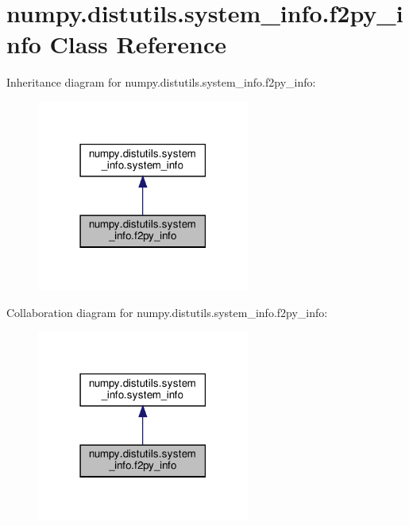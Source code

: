 \hypertarget{classnumpy_1_1distutils_1_1system__info_1_1f2py__info}{}\section{numpy.\+distutils.\+system\+\_\+info.\+f2py\+\_\+info Class Reference}
\label{classnumpy_1_1distutils_1_1system__info_1_1f2py__info}


Inheritance diagram for numpy.\+distutils.\+system\+\_\+info.\+f2py\+\_\+info\+:
\nopagebreak
\begin{figure}[H]
\begin{center}
\leavevmode
\includegraphics[width=198pt]{classnumpy_1_1distutils_1_1system__info_1_1f2py__info__inherit__graph}
\end{center}
\end{figure}


Collaboration diagram for numpy.\+distutils.\+system\+\_\+info.\+f2py\+\_\+info\+:
\nopagebreak
\begin{figure}[H]
\begin{center}
\leavevmode
\includegraphics[width=198pt]{classnumpy_1_1distutils_1_1system__info_1_1f2py__info__coll__graph}
\end{center}
\end{figure}
